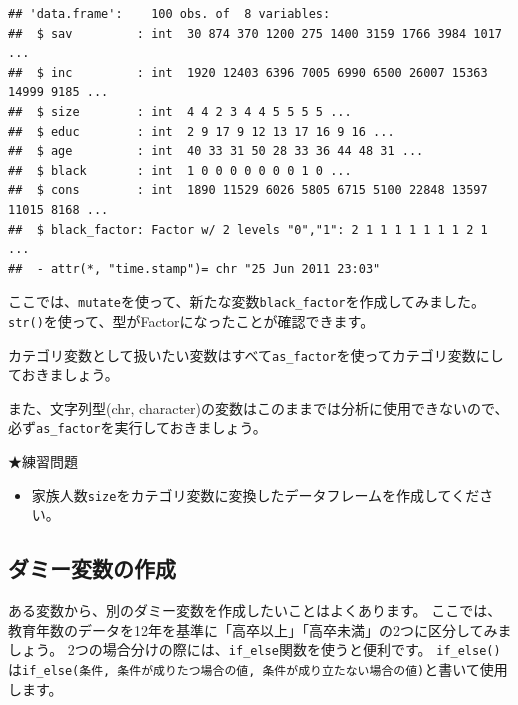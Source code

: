 \documentclass[
]{book}
\newenvironment{Shaded}{\begin{snugshade}}{\end{snugshade}}
\newcommand{\CommentTok}[1]{\textcolor[rgb]{0.56,0.35,0.01}{\textit{#1}}}
\newcommand{\FunctionTok}[1]{\textcolor[rgb]{0.00,0.00,0.00}{#1}}
\newcommand{\NormalTok}[1]{#1}
\newcommand{\SpecialCharTok}[1]{\textcolor[rgb]{0.00,0.00,0.00}{#1}}
\providecommand{\tightlist}{%
  \setlength{\itemsep}{0pt}\setlength{\parskip}{0pt}}
\begin{document}
\begin{verbatim}
## 'data.frame':    100 obs. of  8 variables:
##  $ sav         : int  30 874 370 1200 275 1400 3159 1766 3984 1017 ...
##  $ inc         : int  1920 12403 6396 7005 6990 6500 26007 15363 14999 9185 ...
##  $ size        : int  4 4 2 3 4 4 5 5 5 5 ...
##  $ educ        : int  2 9 17 9 12 13 17 16 9 16 ...
##  $ age         : int  40 33 31 50 28 33 36 44 48 31 ...
##  $ black       : int  1 0 0 0 0 0 0 0 1 0 ...
##  $ cons        : int  1890 11529 6026 5805 6715 5100 22848 13597 11015 8168 ...
##  $ black_factor: Factor w/ 2 levels "0","1": 2 1 1 1 1 1 1 1 2 1 ...
##  - attr(*, "time.stamp")= chr "25 Jun 2011 23:03"
\end{verbatim}

ここでは、\texttt{mutate}を使って、新たな変数\texttt{black\_factor}を作成してみました。
\texttt{str()}を使って、型がFactorになったことが確認できます。

カテゴリ変数として扱いたい変数はすべて\texttt{as\_factor}を使ってカテゴリ変数にしておきましょう。

また、文字列型(chr, character)の変数はこのままでは分析に使用できないので、必ず\texttt{as\_factor}を実行しておきましょう。

★練習問題

\begin{itemize}
\tightlist
\item
  家族人数\texttt{size}をカテゴリ変数に変換したデータフレームを作成してください。
\end{itemize}

\hypertarget{ux30c0ux30dfux30fcux5909ux6570ux306eux4f5cux6210}{%
\subsection{ダミー変数の作成}\label{ux30c0ux30dfux30fcux5909ux6570ux306eux4f5cux6210}}

ある変数から、別のダミー変数を作成したいことはよくあります。
ここでは、教育年数のデータを12年を基準に「高卒以上」「高卒未満」の2つに区分してみましょう。
2つの場合分けの際には、\texttt{if\_else}関数を使うと便利です。
\texttt{if\_else()}は\texttt{if\_else(条件,\ 条件が成りたつ場合の値,\ 条件が成り立たない場合の値)}と書いて使用します。

\begin{Shaded}
\end{Shaded}
\end{document}
